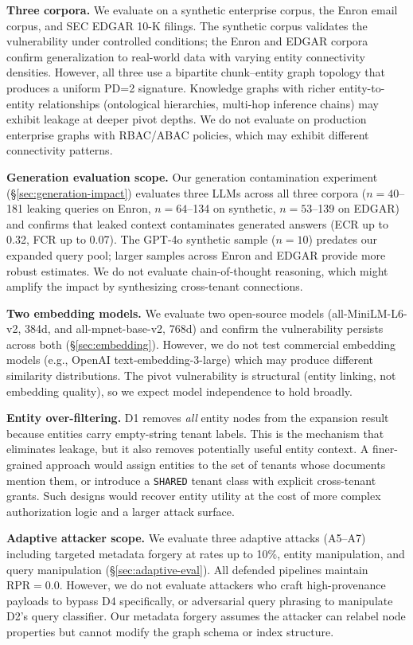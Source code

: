 \documentclass[letterpaper,twocolumn,10pt]{article}
\begin{document}
\textbf{Three corpora.} We evaluate on a synthetic enterprise corpus,
the Enron email corpus, and SEC EDGAR 10-K filings. The synthetic
corpus validates the vulnerability under controlled conditions; the
Enron and EDGAR corpora confirm generalization to real-world data
with varying entity connectivity densities. However, all three use a
bipartite chunk--entity graph topology that produces a uniform PD=2
signature.
Knowledge graphs with richer entity-to-entity relationships
(ontological hierarchies, multi-hop inference chains) may exhibit
leakage at deeper pivot depths. We do not evaluate on production
enterprise graphs with RBAC/ABAC policies, which may exhibit
different connectivity patterns.

\textbf{Generation evaluation scope.} Our generation contamination
experiment (\S\ref{sec:generation-impact}) evaluates three LLMs across
all three corpora ($n{=}40$--181 leaking queries on Enron, $n{=}64$--134 on
synthetic, $n{=}53$--139 on EDGAR) and confirms that leaked context
contaminates generated answers (ECR up to 0.32, FCR up to 0.07). The
GPT-4o synthetic sample ($n{=}10$) predates our expanded query pool;
larger samples across Enron and EDGAR provide more robust estimates.
We do not evaluate chain-of-thought reasoning, which might amplify the
impact by synthesizing cross-tenant connections.

\textbf{Two embedding models.} We evaluate two open-source models
(all-MiniLM-L6-v2, 384d, and all-mpnet-base-v2, 768d) and confirm
the vulnerability persists across both (\S\ref{sec:embedding}).
However, we do not test commercial embedding models (e.g., OpenAI
text-embedding-3-large) which may produce different similarity
distributions. The pivot vulnerability is structural (entity linking,
not embedding quality), so we expect model independence to hold broadly.

\textbf{Entity over-filtering.} D1 removes \emph{all} entity nodes
from the expansion result because entities carry empty-string tenant
labels. This is the mechanism that eliminates leakage, but it also
removes potentially useful entity context. A finer-grained approach
would assign entities to the set of tenants whose documents mention
them, or introduce a \texttt{SHARED} tenant class with explicit
cross-tenant grants. Such designs would recover entity utility at the
cost of more complex authorization logic and a larger attack surface.

\textbf{Adaptive attacker scope.} We evaluate three adaptive attacks
(A5--A7) including targeted metadata forgery at rates up to 10\%,
entity manipulation, and query manipulation
(\S\ref{sec:adaptive-eval}). All defended pipelines maintain
$\text{RPR} = 0.0$. However, we do not evaluate attackers who craft
high-provenance payloads to bypass D4 specifically, or adversarial
query phrasing to manipulate D2's query classifier. Our metadata
forgery assumes the attacker can relabel node properties but cannot
modify the graph schema or index structure.
\end{document}
